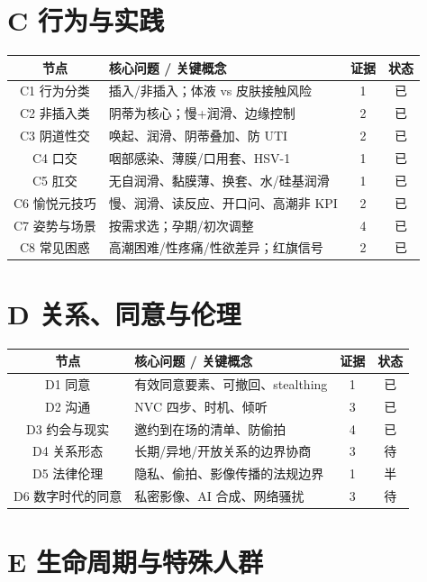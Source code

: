 \section{C 行为与实践}

\begin{tabularx}{\linewidth}{C X c c}
\toprule
\textbf{节点} & \textbf{核心问题 / 关键概念} & \textbf{证据} & \textbf{状态} \\
\midrule
C1 行为分类 & 插入/非插入；体液 vs 皮肤接触风险 & 1 & 已 \\
C2 非插入类 & 阴蒂为核心；慢+润滑、边缘控制 & 2 & 已 \\
C3 阴道性交 & 唤起、润滑、阴蒂叠加、防 UTI & 2 & 已 \\
C4 口交 & 咽部感染、薄膜/口用套、HSV-1 & 1 & 已 \\
C5 肛交 & 无自润滑、黏膜薄、换套、水/硅基润滑 & 1 & 已 \\
C6 愉悦元技巧 & 慢、润滑、读反应、开口问、高潮非 KPI & 2 & 已 \\
C7 姿势与场景 & 按需求选；孕期/初次调整 & 4 & 已 \\
C8 常见困惑 & 高潮困难/性疼痛/性欲差异；红旗信号 & 2 & 已 \\
\bottomrule
\end{tabularx}

\section{D 关系、同意与伦理}

\begin{tabularx}{\linewidth}{C X c c}
\toprule
\textbf{节点} & \textbf{核心问题 / 关键概念} & \textbf{证据} & \textbf{状态} \\
\midrule
D1 同意 & 有效同意要素、可撤回、stealthing & 1 & 已 \\
D2 沟通 & NVC 四步、时机、倾听 & 3 & 已 \\
D3 约会与现实 & 邀约到在场的清单、防偷拍 & 4 & 已 \\
D4 关系形态 & 长期/异地/开放关系的边界协商 & 3 & 待 \\
D5 法律伦理 & 隐私、偷拍、影像传播的法规边界 & 1 & 半 \\
D6 数字时代的同意 & 私密影像、AI 合成、网络骚扰 & 3 & 待 \\
\bottomrule
\end{tabularx}

\section{E 生命周期与特殊人群}


